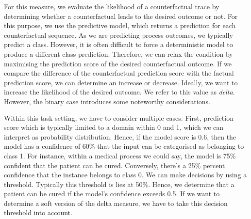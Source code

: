 \documentclass[./../../paper.tex]{subfiles}
\begin{document}
For this measure, we evaluate the likelihood of a counterfactual trace by determining whether a counterfactual leads to the desired outcome or not. For this purpose, we use the predictive model, which returns a prediction for each counterfactual sequence. As we are predicting process outcomes, we typically predict a class. However, it is often difficult to force a deterministic model to produce a different class prediction. Therefore, we can relax the condition by maximising the prediction score of the desired counterfactual outcome\autocite{molnar2019}. If we compare the difference of the counterfactual prediction score with the factual prediction score, we can determine an increase or decrease. Ideally, we want to increase the likelihood of the desired outcome. We refer to this value as \emph{delta}. However, the binary case introduces some noteworthy considerations. 

Within this task setting, we have to consider multiple cases. First, prediction score which is typically limited to a domain within 0 and 1, which we can interpret as probability distribution. Hence, if the model score is 0.6, then the model has a confidence of 60\% that the input can be categorised as belonging to class 1. For instance, within a medical process we could say, the model is 75\% confident that the patient can be cured. Conversely, there's a 25\% percent confidence that the \gls{instance} belongs to class 0. We can make decisions by using a threshold. Typically this threshold is lies at 50\%. Hence, we determine that a patient can be cured if the model's confidence exceeds 0.5\footnotemark. If we want to determine a soft version of the delta measure, we have to take this decision threshold into account.
\end{document}
